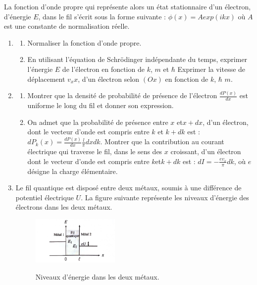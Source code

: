 \documentclass{article}
\begin{document}
La fonction d’onde propre qui représente alors un état stationnaire d’un électron, d’énergie
$E$, dans le fil s’écrit sous la forme suivante :
$\phi(x) = Aexp(ikx)$
où $A$ est une constante de normalisation réelle. 
\begin{enumerate}
  \item
  \begin{enumerate}
  \item Normaliser la fonction d’onde propre. 
  \item En utilisant l’équation de Schrödinger indépendante du temps, exprimer l’énergie $E$ de
  l’électron en fonction de $k$, $m$ et $\hbar$ Exprimer la vitesse de déplacement $v_xx$, d’un électron selon
  $(Ox)$ en fonction de $k$, $\hbar$ $m$.
  \end{enumerate}
  \item 
  \begin{enumerate} 
    \item Montrer que la densité de probabilité de présence de l’électron $\frac{dP(x)}{dx}$ est uniforme le
  long du fil et donner son expression.
  \item On admet que la probabilité de présence entre $x$ et$ x + dx$, d’un électron, dont le vecteur d'onde est compris entre $k$ et $k+dk$
  est : $dP_k(x)=\frac{dP(x)}{dx}\frac{l}{\pi} dxdk$. Montrer que la contribution au courant électrique qui traverse le fil, dans le sens des $x$ croissant,
  d’un électron dont le vecteur d’onde est compris entre $k $et$ k +dk$ est :
  $dI=-\frac{e v_x}{\pi} dk$, où $e$ désigne la charge élémentaire.
  \end{enumerate}
 \item Le fil quantique est disposé entre deux métaux, soumis à une différence de potentiel électrique
 $U$. La figure suivante représente les niveaux d’énergie des électrons dans les deux métaux.

 
\begin{figure}[h]
  \centering
  \includegraphics[width=0.4\textwidth]{énergie.png}
  \label{fig:monlabel}
    \caption{Niveaux d'énergie dans les deux métaux.}
\end{figure}
  


\end{enumerate}
\end{document}
